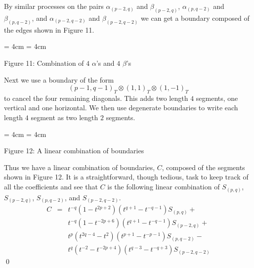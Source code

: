 \documentclass{slides}
\begin{document}
\begin{slide}
By similar processes on the pairs
$\alpha_{(p-2,q)}$ and $\beta_{(p-2,q)}$,
$\alpha_{(p,q-2)}$ and $\beta_{(p,q-2)}$,
and
$\alpha_{(p-2,q-2)}$ and $\beta_{(p-2,q-2)}$ we can get a boundary
composed of the edges shown in Figure 11.

  \begin{center}
    \epsfxsize = 4cm
    \epsfysize = 4cm

Figure 11:  Combination of $4$ $\alpha$'s and $4$ $\beta$'s
  \end{center}

Next we use a boundary of the form
$$(p-1,q-1)_T \otimes (1,1)_T \otimes (1,-1)_T$$ to cancel
the four remaining diagonals.  This adds two length $4$
segments, one vertical and one horizontal.  We then
use degenerate boundaries to write each length $4$ segment
as two length $2$ segments.
\end{slide}

\begin{slide}

  \begin{center}
    \epsfxsize = 4cm
    \epsfysize = 4cm

Figure 12:  A linear combination of boundaries
  \end{center}

Thus we have a linear combination of boundaries, $C$, composed of the
segments shown in Figure 12.  It is a straightforward, though
tedious, task to keep track of all the coefficients and see that $C$
is the following linear combination of
$S_{(p,q)}$, $S_{(p-2,q)}$, $S_{(p,q-2)}$, and $S_{(p-2,q-2)}$.
\begin{eqnarray}
C & = & t^{-q}(1-t^{2p+2}) (t^{q+1} - t^{-q-1}) S_{(p,q)} + \nonumber \\
& &		t^{-q}(1-t^{-2p+6}) (t^{q+1} - t^{-q-1}) S_{(p-2,q)} + \nonumber \\
& &		t^{p}(t^{2q-4} - t^2) (t^{p+1} - t^{-p-1}) S_{(p, q-2)} - \nonumber \\
& &		t^{q}(t^{-2} - t^{-2p+4}) (t^{q-3} - t^{-q+3}) S_{(p-2,q-2)} \nonumber
\end{eqnarray}
\qed
\end{slide}
\end{document}
